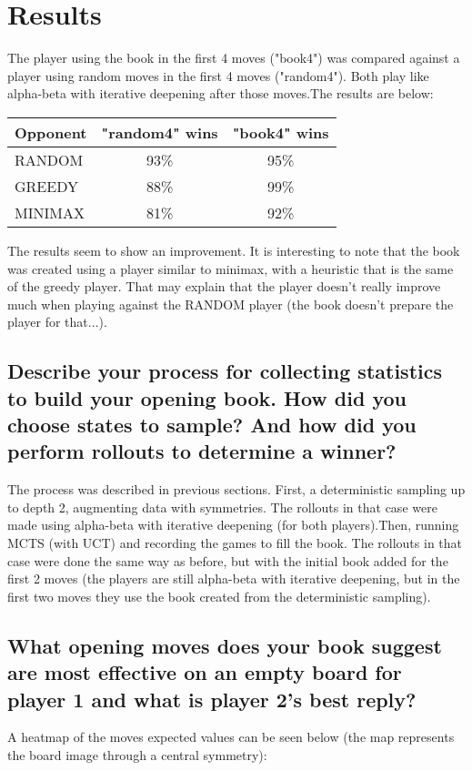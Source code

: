 \documentclass[a4paper,12pt]{article}
\begin{document}
\section{Results}
The player using the book in the first 4 moves ("book4") was compared against a player using random moves in the first 4 moves ("random4"). Both play like alpha-beta with iterative deepening after those moves.The results are below:\\

\begin{tabular}{|l|c|c|}
 \hline
Opponent & "random4" wins & "book4" wins\\
\hline
RANDOM & 93\% & 95\%\\
\hline
GREEDY & 88\% & 99\%\\
\hline
MINIMAX & 81\% & 92\%\\
\hline
\end{tabular}

The results seem to show an improvement. It is interesting to note that the book was created using a player similar to minimax, with a heuristic that is the same of the greedy player. That may explain that the player doesn't really improve much when playing against the RANDOM player (the book doesn't prepare the player for that...).

\subsection{Describe your process for collecting statistics to build your opening book. How did you choose states to sample? And how did you perform rollouts to determine a winner?}
The process was described in previous sections. First, a deterministic sampling up to depth 2, augmenting data with symmetries. The rollouts in that case were made using alpha-beta with iterative deepening (for both players).Then, running MCTS (with UCT) and recording the games to fill the book. The rollouts in that case were done the same way as before, but with the initial book added for the first 2 moves (the players are still alpha-beta with iterative deepening, but in the first two moves they use the book created from the deterministic sampling).

\subsection{What opening moves does your book suggest are most effective on an empty board for player 1 and what is player 2's best reply? }
A heatmap of the moves expected values can be seen below (the map represents the board image through a central symmetry):
\end{document}
